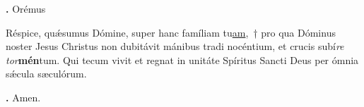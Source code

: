 \textbf{\Vbar.} Orémus

Réspice, qu\'{\ae}sumus Dómine, super hanc famíliam tu\underline{am},~† pro qua Dóminus noster Jesus Christus non dubitávit mánibus tradi nocéntium, et crucis subí\textit{re tor}\textbf{mén}tum.
Qui tecum vivit et regnat in unitáte Spíritus Sancti Deus per ómnia s\'{\ae}cula sæculórum.

\textbf{\Rbar.} Amen.

